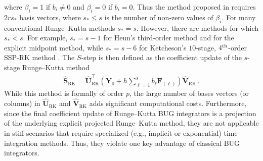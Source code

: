 \documentclass[preprint,runningheads]{svjour3}
\def\wh{\widehat}
\newcommand\bfF{{\mathbf F}}
\newcommand\bfS{{\mathbf S}}
\newcommand\bfU{{\mathbf U}}
\newcommand\bfV{{\mathbf V}}
\newcommand\bfY{{\mathbf Y}}
\begin{document}
where $\beta_i = 1$ if $b_i \neq 0$ and $\beta_i = 0$ if $b_i = 0$. Thus the method proposed in \cite{nobile2025robust} requires $2rs_*$ basis vectors, where $s_* \leq s$ is the number of non-zero values of $\beta_i$. For many conventional Runge--Kutta methods $ s_*=s$.  However, there are methods for which $s_* < s$.  For example, $s_* = s-1$ for Heun's third-order method and for the explicit midpoint method, while $s_*=s-6$ for Ketcheson's $10$-stage, $4\textsuperscript{th}$-order SSP-RK method \cite{Ketcheson2008}. 
The $S$-step is then defined as the coefficient update of the $s$-stage Runge--Kutta method
\begin{align}
    \wh \bfS_{\mathrm{RK}} = \widehat\bfU_{\mathrm{RK}}^{\top}\left(\bfY_0 + h\sum_{\ell = 1}^{s}b_{\ell}\bfF_{(\ell)}\right)\widehat\bfV_{\mathrm{RK}}\,.
\end{align}
{While this method is formally of order $p$, the large number of bases vectors (or columns) in $ \widehat\bfU_{\mathrm{RK}}$ and $ \widehat\bfV_{\mathrm{RK}}$ adds significant computational costs. Furthermore, since the final coefficient update of Runge--Kutta BUG integrators is a projection of the underlying explicit projected Runge--Kutta method, they are not applicable in stiff scenarios that require specialized (e.g., implicit or exponential) time integration methods. Thus, they violate one key advantage of classical BUG integrators.}
\end{document}
